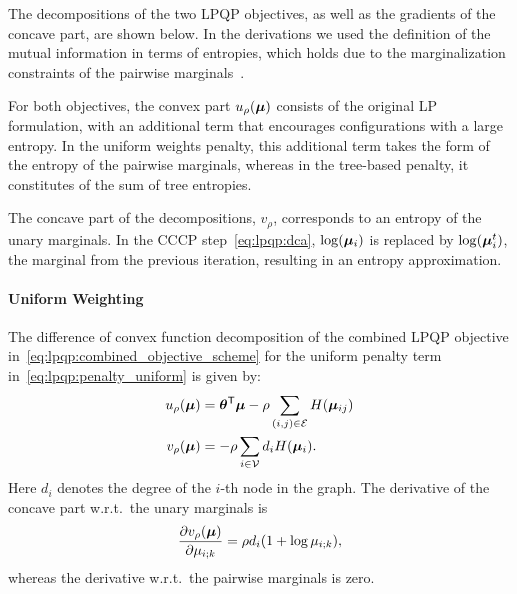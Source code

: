 The decompositions of the two \ac{LPQP} objectives, as well as the gradients of the
concave part, are shown below. In the derivations we used
the definition of the mutual information in terms of entropies,
which holds due to the marginalization constraints of the pairwise
marginals~\parencite{Wainwright2008}.

For both objectives, the convex part $u_{\rho}(\bm{\mu})$ consists of
the original \ac{LP} formulation, with an additional term that encourages
configurations with a large entropy. In the uniform weights penalty, this
additional term takes the form of the entropy of the pairwise 
marginals, whereas in the tree-based penalty, it constitutes of the sum of
tree entropies.
 
The concave part of the decompositions, $v_{\rho}$, corresponds to an entropy of the unary 
marginals. In the \ac{CCCP} step~\eqref{eq:lpqp:dca}, $\log(\bm{\mu}_{i})$ is replaced by
$\log(\bm{\mu}_{i}^t)$, the marginal from the previous iteration, resulting in 
an entropy approximation.


\paragraph{Uniform Weighting}

The difference of convex function decomposition of the combined \ac{LPQP}
objective in~\eqref{eq:lpqp:combined_objective_scheme} for the uniform penalty term
in~\eqref{eq:lpqp:penalty_uniform} is given by:
\begin{align*}
    u_{\rho}(\bm{\mu}) & = \bm{\theta}^{\mathsf{T}} \bm{\mu} - \rho
    \sum_{(i,j)\in\mathcal{E}} H(\bm{\mu}_{ij}) \\
    v_{\rho}(\bm{\mu}) & = -\rho\sum_{i \in\mathcal{V}} d_i
    H(\bm{\mu}_i).
\end{align*}
Here $d_i$ denotes the degree of the $i$-th node in the graph. The derivative
of the concave part w.r.t.\ the unary marginals is
\[
    \frac{\partial v_{\rho}(\bm{\mu})}{\partial \mu_{i;k}} =
\rho d_i (1+ \log\mu_{i;k}),
\]
whereas the derivative w.r.t.\ the pairwise marginals is zero.

